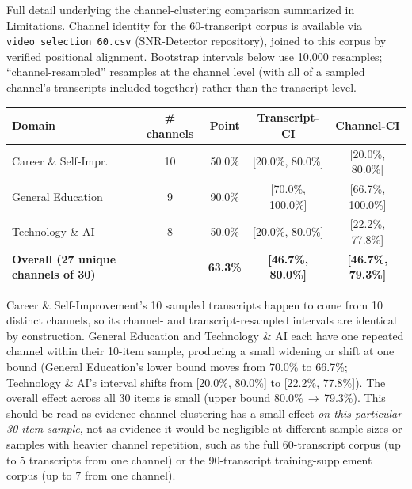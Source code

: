 \documentclass[11pt]{article}
\begin{document}
Full detail underlying the channel-clustering comparison summarized in
Limitations. Channel identity for the 60-transcript corpus is available
via \texttt{video\_selection\_60.csv} (SNR-Detector repository), joined to
this corpus by verified positional alignment. Bootstrap intervals below use
10{,}000 resamples; ``channel-resampled'' resamples at the channel level
(with all of a sampled channel's transcripts included together) rather
than the transcript level.

\begin{center}
\footnotesize
\begin{tabular}{lcccc}
\toprule
\textbf{Domain} & \textbf{\# channels} & \textbf{Point} & \textbf{Transcript-CI} & \textbf{Channel-CI} \\
\midrule
Career \& Self-Impr.  & 10 & 50.0\% & [20.0\%, 80.0\%]  & [20.0\%, 80.0\%] \\
General Education     &  9 & 90.0\% & [70.0\%, 100.0\%] & [66.7\%, 100.0\%] \\
Technology \& AI       &  8 & 50.0\% & [20.0\%, 80.0\%]  & [22.2\%, 77.8\%] \\
\midrule
\textbf{Overall (27 unique channels of 30)} & & \textbf{63.3\%} & \textbf{[46.7\%, 80.0\%]} & \textbf{[46.7\%, 79.3\%]} \\
\bottomrule
\end{tabular}
\end{center}

Career \& Self-Improvement's 10 sampled transcripts happen to come from 10
distinct channels, so its channel- and transcript-resampled intervals are
identical by construction. General Education and Technology \& AI each
have one repeated channel within their 10-item sample, producing a small
widening or shift at one bound (General Education's lower bound moves from
70.0\% to 66.7\%; Technology \& AI's interval shifts from [20.0\%, 80.0\%]
to [22.2\%, 77.8\%]). The overall effect across all 30 items is small (upper
bound 80.0\%\,$\to$\,79.3\%). This should be read as evidence channel
clustering has a small effect \emph{on this particular 30-item sample},
not as evidence it would be negligible at different sample sizes or
samples with heavier channel repetition, such as the full 60-transcript
corpus (up to 5 transcripts from one channel) or the 90-transcript
training-supplement corpus (up to 7 from one channel).
\end{document}
